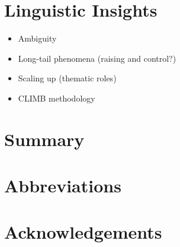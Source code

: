 \documentclass[output=paper,nonflat]{langsci/langscibook}
\begin{document}
\section{Linguistic Insights}
\label{cl:insight}

\begin{itemize}
    \item Ambiguity %
    \item Long-tail phenomena (raising and control?) %
    \item Scaling up (thematic roles) %
    \item CLIMB methodology %
\end{itemize}

\section{Summary}

\section*{Abbreviations}
\section*{Acknowledgements}

\printbibliography[heading=subbibliography,notkeyword=this] 
\end{document}
